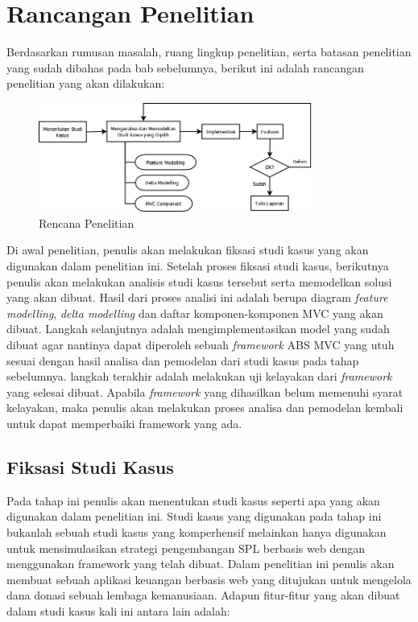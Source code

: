 \chapter{Rancangan Penelitian}

Berdasarkan rumusan masalah, ruang lingkup penelitian, serta batasan penelitian yang sudah dibahas pada bab sebelumnya, berikut ini adalah rancangan penelitian yang akan dilakukan:

\begin{figure}
    \centering
    \includegraphics[width=0.8\textwidth]
        {img/alur-penelitian.png}
    \caption{Rencana Penelitian}
\end{figure}

\noindent
Di awal penelitian, penulis akan melakukan fiksasi studi kasus yang akan digunakan dalam penelitian ini. Setelah proses fiksasi studi kasus, berikutnya penulis akan melakukan analisis studi kasus tersebut serta memodelkan solusi yang akan dibuat. Hasil dari proses analisi ini adalah berupa diagram \textit{feature modelling}, \textit{delta modelling} dan daftar komponen-komponen MVC yang akan dibuat. Langkah selanjutnya adalah mengimplementasikan model yang sudah dibuat agar nantinya dapat diperoleh sebuah \textit{framework} ABS MVC yang utuh sesuai dengan hasil analisa dan pemodelan dari studi kasus pada tahap sebelumnya. langkah terakhir adalah melakukan uji kelayakan dari \textit{framework} yang selesai dibuat. Apabila \textit{framework} yang dihasilkan belum memenuhi syarat kelayakan, maka penulis akan melakukan proses analisa dan pemodelan kembali untuk dapat memperbaiki framework yang ada.

\section{Fiksasi Studi Kasus}
Pada tahap ini penulis akan menentukan studi kasus seperti apa yang akan digunakan dalam penelitian ini. Studi kasus yang digunakan pada tahap ini bukanlah sebuah studi kasus yang komperhensif melainkan hanya digunakan untuk mensimulasikan strategi pengembangan SPL berbasis web dengan menggunakan framework yang telah dibuat. Dalam penelitian ini penulis akan membuat sebuah aplikasi keuangan berbasis web yang ditujukan untuk mengelola dana donasi sebuah lembaga kemanusiaan. Adapun fitur-fitur yang akan dibuat dalam studi kasus kali ini antara lain adalah:

